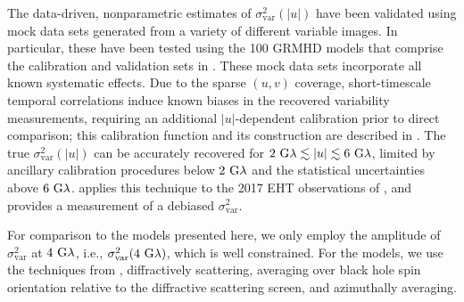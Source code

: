 The data-driven, nonparametric estimates of $\sigma_\text{var}^2 (|u|)$ have been validated using mock data sets generated from a variety of different variable images.  In particular, these have been tested using the 100 GRMHD models that comprise the calibration and validation sets in .  These mock data sets incorporate all known systematic effects.  Due to the sparse $(u,v)$ coverage, short-timescale temporal correlations induce known biases in the recovered variability measurements, requiring an additional $|u|$-dependent calibration prior to direct comparison; this calibration function and its construction are described in \citep{NoiseModeling}.  The true $\sigma_\text{var}^2 (|u|)$ can be accurately recovered for $2~{\rm G}\lambda\lesssim|u|\lesssim6~{\rm G}\lambda$, limited by ancillary calibration procedures below $2~{\rm G}\lambda$ and the statistical uncertainties above $6~{\rm G}\lambda$.   applies this technique to the 2017 EHT observations of \sgra, and provides a measurement of a debiased $\sigma_\text{var}^2$. 

For comparison to the models presented here, we only employ the amplitude of $\sigma_\text{var}^2$ at $4~{\rm G}\lambda$, i.e.,   $\sigma_\text{var}^2 (4~{\rm G}\lambda)$, which is well constrained. 
For the models, we use the techniques from \citet{Georgiev_2022}, diffractively scattering, averaging over black hole spin orientation relative to the diffractive scattering screen, and azimuthally averaging. 



